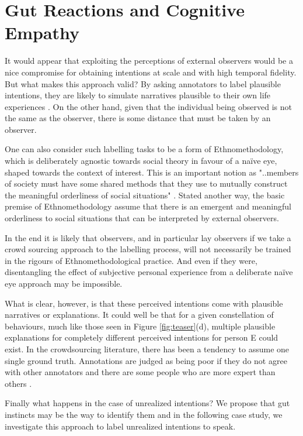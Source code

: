 \documentclass[sigconf]{acmart}
\begin{document}
\section{Gut Reactions and Cognitive Empathy}
It would appear that exploiting the perceptions of external observers would be a nice compromise for obtaining intentions at scale and with high temporal fidelity. But what makes this approach valid? By asking annotators to label plausible intentions, they are likely to simulate narratives plausible to their own life experiences \cite{Decety2004,barrett2017emotions,Ridderinkhof2022}. On the other hand, given that the individual being observed is not the same as the observer, there is some distance that must be taken by an observer. 

One can also consider such labelling tasks to be a form of Ethnomethodology, which is deliberately agnostic towards social theory in favour of a naïve eye, shaped towards the context of interest. This is an important notion as "..members of society must have some shared methods that they use to mutually construct the meaningful orderliness of social situations" \cite{Blackwell2003}. Stated another way, the basic premise of Ethnomethodology assume that there is an emergent and meaningful orderliness to social situations that can be interpreted by external observers. 

In the end it is likely that observers, and in particular lay observers if we take a crowd sourcing approach to the labelling process, will not necessarily be trained in the rigours of Ethnomethodological practice. And even if they were, disentangling the effect of subjective personal experience from a deliberate naïve eye approach may be impossible. 

What is clear, however, is that these perceived intentions come with plausible narratives or explanations. It could well be that for a given constellation of behaviours, much like those seen in Figure \ref{fig:teaser}(d), multiple plausible explanations for completely different perceived intentions for person E could exist. In the crowdsourcing literature, there has been a tendency to assume one single ground truth. Annotations are judged as being poor if they do not agree with other annotators and there are some people who are more expert than others \cite{10.1609/aimag.v36i1.2564}. 

Finally what happens in the case of unrealized intentions? We propose that gut instincts may be the way to identify them and in the following case study, we investigate this approach to label unrealized intentions to speak.
\end{document}
